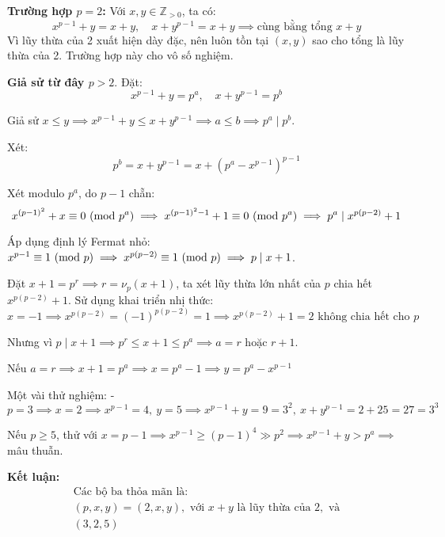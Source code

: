\documentclass[../05-modular-arithmetic-a.tex]{subfiles}
\begin{document}
\begin{soln}\footnotemark
	\textbf{Trường hợp \( p = 2 \):} Với \( x, y \in \mathbb{Z}_{>0} \), ta có:
	\[
		x^{p-1} + y = x + y,\quad x + y^{p-1} = x + y
	\implies \text{cùng bằng tổng } x + y
	\]
	Vì lũy thừa của 2 xuất hiện dày đặc, nên luôn tồn tại \( (x, y) \) sao cho tổng là lũy thừa của 2. Trường hợp này cho vô số nghiệm.

	\textbf{Giả sử từ đây \( p > 2 \)}. Đặt:
	\[
		x^{p-1} + y = p^a,\quad x + y^{p-1} = p^b
	\]

	Giả sử \( x \le y \implies x^{p-1} + y \le x + y^{p-1} \implies a \le b \implies p^a \mid p^b \).

	Xét:
	\[
		p^b = x + y^{p-1} = x + (p^a - x^{p-1})^{p-1}
	\]

	Xét modulo \( p^a \), do \( p - 1 \) chẵn:
	\[
		x^{(p-1)^2} + x \equiv 0 \ (\mathrm{mod}\ p^a)
	\implies x^{(p-1)^2 - 1} + 1 \equiv 0 \ (\mathrm{mod}\ p^a)
	\implies p^a \mid x^{p(p - 2)} + 1
	\]

	Áp dụng định lý Fermat nhỏ: \( x^{p-1} \equiv 1 \ (\mathrm{mod}\ p) \implies x^{p(p - 2)} \equiv 1 \ (\mathrm{mod}\ p) \implies p \mid x + 1 \).

	Đặt \( x + 1 = p^r \implies r = \nu_p(x + 1) \), ta xét lũy thừa lớn nhất của \( p \) chia hết \( x^{p(p - 2)} + 1 \).  
	Sử dụng khai triển nhị thức:
	\[
		x = -1 \implies x^{p(p - 2)} = (-1)^{p(p - 2)} = 1 \implies x^{p(p - 2)} + 1 = 2 \text{ không chia hết cho } p
	\]

	Nhưng vì \( p \mid x + 1 \implies p^r \le x + 1 \le p^a \implies a = r \) hoặc \( r + 1 \).

	Nếu \( a = r \implies x + 1 = p^a \implies x = p^a - 1 \implies y = p^a - x^{p-1} \)

	Một vài thử nghiệm:
	- \( p = 3 \implies x = 2 \implies x^{p-1} = 4,\ y = 5 \implies x^{p-1} + y = 9 = 3^2,\ x + y^{p-1} = 2 + 25 = 27 = 3^3 \)

	Nếu \( p \ge 5 \), thử với \( x = p - 1 \implies x^{p-1} \ge (p - 1)^4 \gg p^2 \implies x^{p-1} + y > p^a \implies \) mâu thuẫn.

	\textbf{Kết luận:}
	\[
		\boxed{
			\begin{array}{l}
				\text{Các bộ ba thỏa mãn là:} \\
				(p, x, y) = (2, x, y), \text{ với } x + y \text{ là lũy thừa của } 2, \text{ và} \\
				(3, 2, 5)
			\end{array}
		}
	\]
\end{soln}

\end{document}

